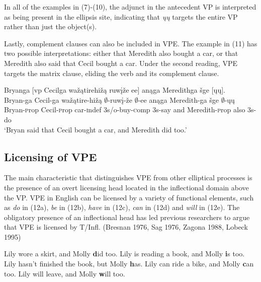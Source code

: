 \documentclass[output=paper]{LSP/langsci}
\begin{document}
In all of the examples in (7)-(10), the adjunct in the antecedent VP is interpreted as being present in the ellipsis site, indicating that \emph{\k{u}\k{u}} targets the entire VP rather than just the object(s).

Lastly, complement clauses can also be included in VPE. The example in (11) has two possible interpretations: either that Meredith also bought a car, or that Meredith also said that Cecil bought a car. Under the second reading, VPE targets the matrix clause, eliding the verb and its complement clause.

\begin{exe}
\ex
\glll Bryanga {\textsc [vp} Cecilga wa\v{z}\k{a}tirehi\v{z}\k{a} ruw\k{i}\v{z}e ee{\textsc ]} an\k{a}ga Meredithga \v{s}ge {\textsc [}\k{u}\k{u}{\textsc ]}.\\
Bryan-ga {} Cecil-ga wa\v{z}\k{a}tire-hi\v{z}\k{a} $\emptyset$-ruw\k{i}-\v{z}e $\emptyset$-ee an\k{a}ga Meredith-ga \v{s}ge $\emptyset$-\k{u}\k{u}\\
Bryan-{\textsc prop} {} Cecil-{\textsc prop} car-{\textsc indef} {\textsc 3s/o}-buy-{\textsc comp} {\textsc 3s}-say and Meredith-{\textsc prop} also {\textsc 3s}-do\\
\trans `Bryan said that Cecil bought a car, and Meredith did too.'
\end{exe}


\subsection{Licensing of VPE}

The main characteristic that distinguishes VPE from other elliptical processes is the presence of an overt licensing head located in the inflectional domain above the VP. VPE in English can be licensed by a variety of functional elements, such as \emph{do} in (12a), \emph{be} in (12b), \emph{have} in (12c), \emph{can} in (12d) and \emph{will} in (12e). The obligatory presence of an inflectional head has led previous researchers to argue that VPE is licensed by T/Infl. (Bresnan 1976, Sag 1976, Zagona 1988, Lobeck 1995)

\begin{exe}
\ex
\begin{xlist}
\ex
Lily wore a skirt, and Molly {\textbf did} too.
\ex
Lily is reading a book, and Molly {\textbf is} too.
\ex
Lily hasn't finished the book, but Molly {\textbf has}.
\ex
Lily can ride a bike, and Molly {\textbf can} too.
\ex
Lily will leave, and Molly {\textbf will} too.
\end{xlist}
\end{exe}
\end{document}
